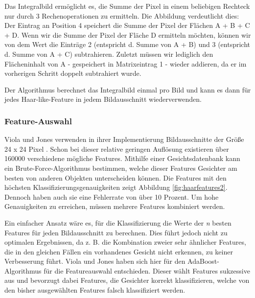 \documentclass[doktyp=semarbeit, sprache=german]{TUBAFarbeiten}
\begin{document}
Das Integralbild ermöglicht es, die Summe der Pixel in einem beliebigen Rechteck nur durch 3 Rechenoperationen zu ermitteln. Die Abbildung verdeutlicht dies: Der Eintrag an Position 4 speichert die Summe der Pixel der Flächen A + B + C + D. Wenn wir die Summe der Pixel der Fläche D ermitteln möchten, können wir von dem Wert die Einträge 2 (entspricht d. Summe von A + B) und 3 (entspricht d. Summe von A + C) subtrahieren. Zuletzt müssen wir lediglich den Flächeninhalt von A - gespeichert in Matrixeintrag 1 - wieder addieren, da er im vorherigen Schritt doppelt subtrahiert wurde. 

Der Algorithmus berechnet das Integralbild einmal pro Bild und kann es dann für jedes Haar-like-Feature in jedem Bildausschnitt wiederverwenden.

\subsubsection{Feature-Auswahl}
Viola und Jones verwenden in ihrer Implementierung Bildausschnitte der Größe 24 x 24 Pixel \cite{Viola01rapidobject}. Schon bei dieser relative geringen Auflösung existieren über 160000 verschiedene mögliche Features. Mithilfe einer Gesichtsdatenbank kann ein Brute-Force-Algorithmus bestimmen, welche dieser Features Gesichter am besten von anderen Objekten unterscheiden können. Die Features mit den höchsten Klassifizierungsgenauigkeiten zeigt Abbildung \ref{fig:haarfeatures2}. Dennoch haben auch sie eine Fehlerrate von über 10 Prozent. Um hohe Genauigkeiten zu erreichen, müssen mehrere Features kombiniert werden.

Ein einfacher Ansatz wäre es, für die Klassifizierung die Werte der \textit{n} besten Features für jeden Bildausschnitt zu berechnen. Dies führt jedoch nicht zu optimalen Ergebnissen, da z. B. die Kombination zweier sehr ähnlicher Features, die in den gleichen Fällen ein vorhandenes Gesicht nicht erkennen, zu keiner Verbesserung führt. Viola und Jones haben sich hier für den AdaBoost-Algorithmus für die Featureauswahl entschieden. Dieser wählt Features sukzessive aus und bevorzugt dabei Features, die Gesichter korrekt klassifizieren, welche von den bisher ausgewählten Features falsch klassifiziert werden.
\end{document}
